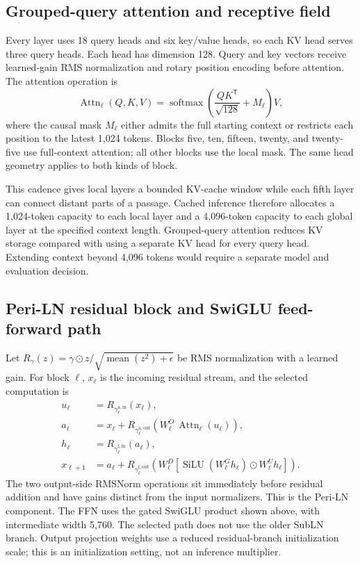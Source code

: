 \documentclass[11pt]{article}
\begin{document}
\subsection{Grouped-query attention and receptive field}

Every layer uses 18 query heads and six key/value heads, so each KV head
serves three query heads. Each head has dimension 128. Query and key
vectors receive learned-gain RMS normalization and rotary position encoding
before attention. The attention operation is
\[
  \operatorname{Attn}_{\ell}(Q,K,V)
  =\operatorname{softmax}\!\left(
     \frac{QK^{\mathsf T}}{\sqrt{128}}+M_{\ell}
   \right)V ,
\]
where the causal mask $M_{\ell}$ either admits the full starting context or
restricts each position to the latest 1,024 tokens. Blocks five, ten,
fifteen, twenty, and twenty-five use full-context attention; all other
blocks use the local mask. The same head geometry applies to both kinds of
block.

This cadence gives local layers a bounded KV-cache window while each fifth
layer can connect distant parts of a passage. Cached inference therefore
allocates a 1,024-token capacity to each local layer and a 4,096-token
capacity to each global layer at the specified context length. Grouped-query
attention reduces KV storage compared with using a separate KV head for
every query head. Extending context beyond 4,096 tokens would require a
separate model and evaluation decision.

\subsection{Peri-LN residual block and SwiGLU feed-forward path}

Let $R_{\gamma}(z)=\gamma\odot z/
\sqrt{\operatorname{mean}(z^2)+\epsilon}$ be RMS normalization with a learned
gain. For block $\ell$, $x_\ell$ is the incoming residual stream, and the
selected computation is
\begin{align}
  u_\ell &= R_{\gamma^{\mathrm{a,in}}_\ell}(x_\ell),\\
  a_\ell &= x_\ell+
    R_{\gamma^{\mathrm{a,out}}_\ell}
    \!\left(W^O_\ell\,\operatorname{Attn}_{\ell}(u_\ell)\right),\\
  h_\ell &= R_{\gamma^{\mathrm{f,in}}_\ell}(a_\ell),\\
  x_{\ell+1} &= a_\ell+
    R_{\gamma^{\mathrm{f,out}}_\ell}
    \!\left(W^D_\ell[
      \operatorname{SiLU}(W^G_\ell h_\ell)\odot W^U_\ell h_\ell
    ]\right).
\end{align}
The two output-side RMSNorm operations sit immediately before residual
addition and have gains distinct from the input normalizers. This is the
Peri-LN component. The FFN uses the gated SwiGLU product shown above,
with intermediate width 5,760. The selected path does not use the older
SubLN branch. Output projection weights use a reduced residual-branch
initialization scale; this is an initialization setting, not an inference
multiplier.
\end{document}
